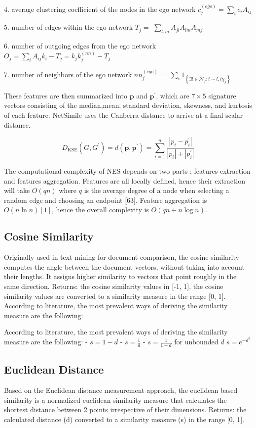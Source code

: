 4. average clustering coefficient of the nodes in the ego network $c_{j}^{(e g o)}=\sum_{i} c_{i} A_{i j}$

5. number of edges within the ego network $T_{j}=$ $\sum_{l, m} A_{j l} A_{l m} A_{m j}$

6. number of outgoing edges from the ego network $O_{j}=\sum_{i} A_{i j} k_{i}-T_{j}=k_{j} k_{j}^{(n n)}-T_{j}$

7. number of neighbors of the ego network $n n_{j}^{(e g o)}=$ $\sum_{i} 1_{\left\{\exists l \in \mathcal{N}_{f}: i \sim l, i \chi_{j}\right\}}$

These features are then summarized into $\mathbf{p}$ and $\mathbf{p}^{\prime}$, which are $7 \times 5$ signature vectors consisting of the median,mean, standard deviation, skewness, and kurtosis of each feature. NetSimile uses the Canberra distance to arrive at a final scalar distance.

$$
D_{\mathrm{KSE}}\left(G, G^{\prime}\right)=d\left(\mathbf{p}, \mathbf{p}^{\prime}\right)=\sum_{i=1}^{n} \frac{\left|p_{i}-p_{i}^{\prime}\right|}{\left|p_{i}\right|+\left|p_{i}^{\prime}\right|}
$$

The computational complexity of NES depends on two parts : features extraction and features aggregation. Features are all locally defined, hence their extraction will take $O(q n)$ where $q$ is the average degree of a node when selecting a random edge and choosing an endpoint [63]. Feature aggregation is $O(n \ln n)[1]$, hence the overall complexity is $O(q n+n \log n)$.

\subsection{Cosine Similarity}
Originally used in text mining for document comparison, the cosine similarity computes the angle between the document vectors, without taking into account their lengths. It assigns higher similarity to vectors that point roughly in the same direction. 
Returns: the cosine similarity values in [-1, 1]. the cosine similarity values are converted to a similarity measure in the range [0, 1]. According to literature, the most prevalent ways of deriving the similarity measure are the following:

According to literature, the most prevalent ways of deriving the similarity measure are the following: 
- $s=1-d$
- $s=\frac{1}{d}$
- $s=\frac{1}{1+d}$ for unbounded $d$
$s=e^{-d^{2}}$

\subsection{Euclidean Distance}
Based on the Euclidean distance measurement approach, the euclidean based similarity  is a normalized euclidean similarity measure that calculates the shortest distance between 2 points irrespective of their dimensions.  Returns: the calculated distance (d) converted to a similarity measure (s) in the range [0, 1].

